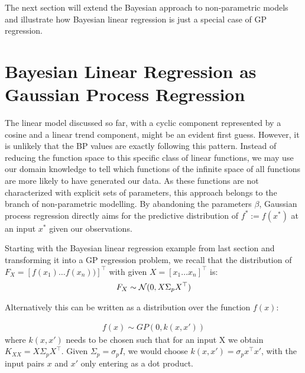 The next section will extend the Bayesian approach to non-parametric models and illustrate how Bayesian linear
regression is just a special case of GP regression.

\section{Bayesian Linear Regression as Gaussian Process Regression}\label{sec:gaussian-process-regression}
The linear model discussed so far, with a cyclic component represented by a cosine and a linear trend component,
might be an evident first guess.
However, it is unlikely that the BP values are exactly following this pattern.
Instead of reducing the function space to this specific class of linear functions, we may use our domain knowledge
to tell which functions of the infinite space of all functions are more likely to have generated our data.
As these functions are not characterized with explicit sets of
parameters, this approach belongs to the branch of non-parametric modelling.
By abandoning the parameters $\beta$, Gaussian process regression
directly aims for the predictive distribution of $f^{\ast} := f(x^{\ast})$ at an input $x^{\ast}$ given our observations.

Starting with the Bayesian linear regression example from last section and transforming it into a GP regression
problem, we recall that the distribution of $F_X = [f(x_1) \dots f(x_n))]^{\top}$ with given $X = [x_1 \dots x_n]^{\top}$ is:
\begin{gather*}
    F_X \sim \operatorname{\mathcal{N}}(0,  X \Sigma_p X^{\top})
\end{gather*}

Alternatively this can be written as a distribution over the function $f(x)$:

\begin{gather*}
    f(x) \sim GP(0, k(x, x'))
\end{gather*}
where $k(x,x')$ needs to be chosen such that for an input X we obtain $K_{XX} =  X \Sigma_p X^{\top}$.
Given $\Sigma_p = \sigma_p I$, we would choose $k(x,x') = \sigma_p x^{\top} x'$, with the
input pairs $x$ and $x'$ only entering as a dot product.




